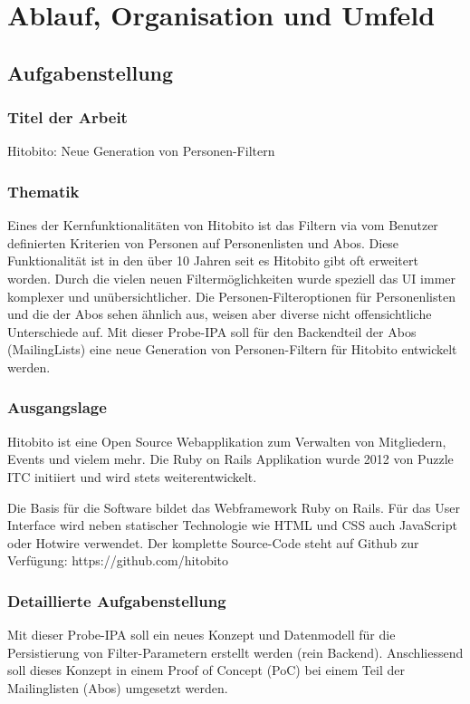 \part[Ablauf, Organisation und Umfeld]{Ablauf, Organisation und Umfeld
    }

\tableofcontents

\chapter{Aufgabenstellung}

\section{Titel der Arbeit}
Hitobito: Neue Generation von Personen-Filtern

\section{Thematik}
Eines der Kernfunktionalitäten von Hitobito ist das Filtern via vom Benutzer definierten Kriterien von Personen auf Personenlisten und Abos. Diese Funktionalität ist in den über 10 Jahren seit es Hitobito gibt oft erweitert worden. Durch die vielen neuen Filtermöglichkeiten wurde speziell das UI immer komplexer und unübersichtlicher. Die Personen-Filteroptionen für Personenlisten und die der Abos sehen ähnlich aus, weisen aber diverse nicht offensichtliche Unterschiede auf. Mit dieser Probe-IPA soll für den Backendteil der Abos (MailingLists) eine neue Generation von Personen-Filtern für Hitobito entwickelt werden.

\section{Ausgangslage}
Hitobito ist eine Open Source Webapplikation zum Verwalten von Mitgliedern, Events und vielem mehr. Die Ruby on Rails Applikation wurde 2012 von Puzzle ITC initiiert und wird stets weiterentwickelt.

Die Basis für die Software bildet das Webframework Ruby on Rails. Für das User Interface wird neben statischer Technologie wie HTML und CSS auch JavaScript oder Hotwire verwendet. Der komplette Source-Code steht auf Github zur Verfügung: https://github.com/hitobito

\section{Detaillierte Aufgabenstellung}
Mit dieser Probe-IPA soll ein neues Konzept und Datenmodell für die Persistierung von Filter-Parametern erstellt werden (rein Backend). Anschliessend soll dieses Konzept in einem Proof of Concept (PoC) bei einem Teil der Mailinglisten (Abos) umgesetzt werden.

